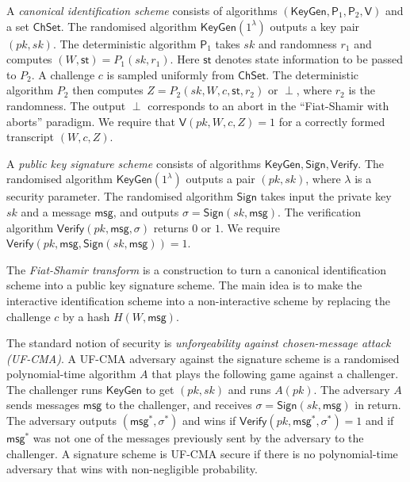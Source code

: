 \documentclass{llncs}
\newcommand{\msg}{\mathsf{msg}}
\newcommand{\KeyGen}{\mathsf{KeyGen}}
\newcommand{\Sign}{\mathsf{Sign}}
\newcommand{\Verify}{\mathsf{Verify}}
\newcommand{\PP}{\mathsf{P}}
\newcommand{\VV}{\mathsf{V}}
\newcommand{\ChSet}{\textsf{ChSet}}
\newcommand{\St}{\textsf{st}}
\begin{document}
A \emph{canonical identification scheme} consists of algorithms $(\KeyGen, \PP_1, \PP_2, \VV)$ and a set $\ChSet$. The randomised algorithm $\KeyGen( 1^\lambda )$ outputs a key pair $(pk,sk)$.
The deterministic algorithm $\PP_1$ takes $sk$ and randomness $r_1$ and computes $(W, \St) = P_1( sk, r_1 )$. 
Here $\St$ denotes state information to be passed to $P_2$.
A challenge $c$ is sampled uniformly from $\ChSet$. The deterministic algorithm $P_2$ then computes $Z = P_2( sk, W, c, \St, r_2 )$ or $\perp$, where $r_2$ is the randomness.
The output $\perp$ corresponds to an abort in the ``Fiat-Shamir with aborts'' paradigm.
We require that $\VV( pk, W, c, Z ) = 1$ for a correctly formed transcript $(W,c,Z)$.


A \emph{public key signature scheme} consists of algorithms $\KeyGen, \Sign, \Verify$.
The randomised algorithm $\KeyGen( 1^\lambda )$ outputs a pair $(pk,sk)$, where $\lambda$ is a security parameter.
The randomised algorithm $\Sign$ takes input the private key $sk$ and a message $\msg$, and  outputs $\sigma = \Sign( sk, \msg )$.
The verification algorithm $\Verify( pk, \msg, \sigma )$ returns $0$ or $1$.
We require $\Verify( pk, \msg, \Sign( sk, \msg )) = 1$.

The \emph{Fiat-Shamir transform} is a construction to turn a canonical identification scheme into a public key signature scheme. The main idea is to make the interactive identification scheme into a non-interactive scheme by replacing the challenge $c$ by a hash $H( W, \msg )$.

The standard notion of security is \emph{unforgeability against chosen-message attack (UF-CMA)}.
A UF-CMA adversary against the signature scheme is a randomised polynomial-time algorithm $A$ that plays the following game against a challenger.
The challenger runs $\KeyGen$ to get $(pk,sk)$ and runs $A( pk )$.
The adversary $A$ sends messages $\msg$ to the challenger, and receives $\sigma = \Sign(sk, \msg)$ in return.
The adversary outputs $(\msg^*, \sigma^*)$ and wins if $\Verify( pk, \msg^*, \sigma^* ) = 1$ and if $\msg^*$ was not one of the messages previously sent by the adversary to the challenger.
A signature scheme is UF-CMA secure if there is no polynomial-time adversary that wins with non-negligible probability.



\end{document}
